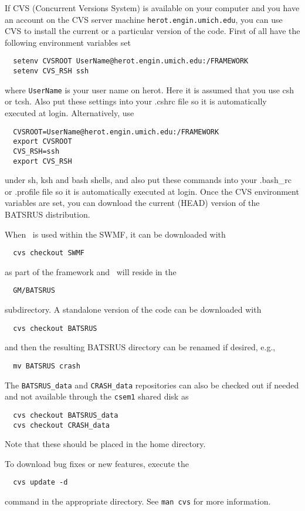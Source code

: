 If CVS (Concurrent Versions System) is available on your computer
and you have an account on the CVS server machine 
{\tt herot.engin.umich.edu}, you can use CVS to install
the current or a particular version of the code.
First of all have the following environment variables set
\begin{verbatim}
  setenv CVSROOT UserName@herot.engin.umich.edu:/FRAMEWORK
  setenv CVS_RSH ssh
\end{verbatim}
where {\tt UserName} is your user name on herot. Here it is assumed
that you use csh or tcsh. Also put these settings into your .cshrc file
so it is automatically executed at login. Alternatively, use
\begin{verbatim}
  CVSROOT=UserName@herot.engin.umich.edu:/FRAMEWORK
  export CVSROOT
  CVS_RSH=ssh
  export CVS_RSH
\end{verbatim}
under sh, ksh and bash shells, and also put these commands into your 
.bash\_rc or .profile file so it is automatically executed at login.
Once the CVS environment variables are set, you can download the
current (HEAD) version of the BATSRUS distribution.

When \BATSRUS\ is used within the SWMF, it can be downloaded with
\begin{verbatim}
  cvs checkout SWMF
\end{verbatim}
as part of the framework and \BATSRUS\ will reside in the
\begin{verbatim}
  GM/BATSRUS
\end{verbatim}
subdirectory. A standalone version of the code can be downloaded with
\begin{verbatim}
  cvs checkout BATSRUS
\end{verbatim}
and then the resulting BATSRUS directory can be renamed if desired, e.g.,
\begin{verbatim}
  mv BATSRUS crash
\end{verbatim}
The {\tt BATSRUS\_data} and {\tt CRASH\_data} repositories can also be 
checked out if needed and not available through the {\tt csem1} 
shared disk as
\begin{verbatim}
  cvs checkout BATSRUS_data
  cvs checkout CRASH_data
\end{verbatim}
Note that these should be placed in the home directory.

To download bug fixes or new features, execute the
\begin{verbatim}
  cvs update -d
\end{verbatim}
command in the appropriate directory. See {\tt man cvs} for more information.

